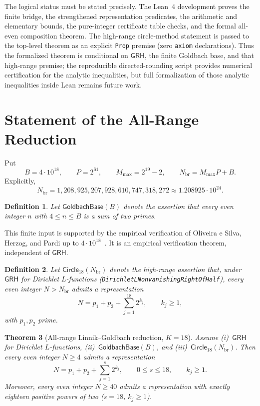\documentclass[11pt,a4paper]{article}
\newtheorem{theorem}{Theorem}[section]
\newtheorem{definition}[theorem]{Definition}
\newcommand{\GoldbachBase}{\mathsf{GoldbachBase}}
\newcommand{\Circle}[1]{\mathsf{Circle}_{#1}}
\newcommand{\GRH}{\mathsf{GRH}}
\begin{document}
The logical status must be stated precisely. The Lean~4 development proves the finite bridge, the strengthened representation predicates, the arithmetic and elementary bounds, the pure-integer certificate table checks, and the formal all-even composition theorem. The high-range circle-method statement is passed to the top-level theorem as an explicit \texttt{Prop} premise (zero \texttt{axiom} declarations). Thus the formalized theorem is conditional on $\GRH$, the finite Goldbach base, and that high-range premise; the reproducible directed-rounding script provides numerical certification for the analytic inequalities, but full formalization of those analytic inequalities inside Lean remains future work.

\section{Statement of the All-Range Reduction}

Put
\[
  B = 4\cdot 10^{18}, \qquad P = 2^{61}, \qquad M_{\max} = 2^{19} - 2, \qquad N_{\mathrm{br}} = M_{\max} P + B.
\]
Explicitly,
\[
  N_{\mathrm{br}} = 1{,}208{,}925{,}207{,}928{,}610{,}747{,}318{,}272 \approx 1.208925\cdot 10^{24}.
\]

\begin{definition}\label{def:base}
Let $\GoldbachBase(B)$ denote the assertion that every even integer $n$ with $4 \le n \le B$ is a sum of two primes.
\end{definition}

This finite input is supported by the empirical verification of Oliveira e Silva, Herzog, and Pardi up to $4\cdot 10^{18}$~\cite{OSHP2014}. It is an empirical verification theorem, independent of $\GRH$.

\begin{definition}\label{def:circle}
Let $\Circle{18}(N_{\mathrm{br}})$ denote the high-range assertion that, under $\GRH$ for Dirichlet $L$-functions (\texttt{DirichletLNonvanishingRightOfHalf}), every even integer $N > N_{\mathrm{br}}$ admits a representation
\[
  N = p_1 + p_2 + \sum_{j=1}^{18} 2^{k_j}, \qquad k_j \ge 1,
\]
with $p_1, p_2$ prime.
\end{definition}

\begin{theorem}[All-range Linnik--Goldbach reduction, $K = 18$]\label{thm:main}
Assume \textup{(i)}~$\GRH$ for Dirichlet $L$-functions, \textup{(ii)}~$\GoldbachBase(B)$, and \textup{(iii)}~$\Circle{18}(N_{\mathrm{br}})$. Then every even integer $N \ge 4$ admits a representation
\[
  \boxed{\;N = p_1 + p_2 + \sum_{j=1}^{s} 2^{k_j}, \qquad 0 \le s \le 18, \qquad k_j \ge 1.\;}
\]
Moreover, every even integer $N \ge 40$ admits a representation with \emph{exactly} eighteen positive powers of two ($s = 18$, $k_j \ge 1$).
\end{theorem}
\end{document}
